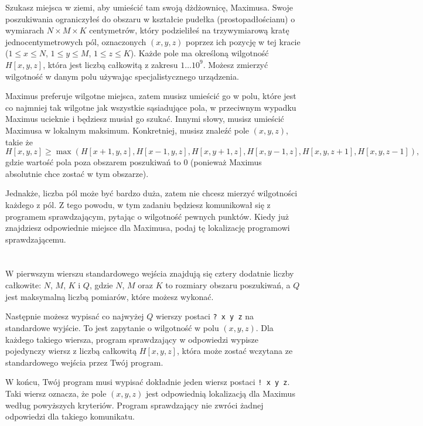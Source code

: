 \ifx\boi\undefined\fi
\def\version{jury-1}

Szukasz miejsca w ziemi, aby umieścić tam swoją dżdżownicę, Maximusa. Swoje poszukiwania ograniczyłeś do obszaru w kształcie pudełka (prostopadłościanu)
o wymiarach $N \times M \times K$ centymetrów, który podzieliłeś na trzywymiarową kratę jednocentymetrowych pól, oznaczonych $(x,y,z)$ poprzez ich pozycję w tej kracie ($1 \le x \le N$, $1 \le y \le M$, $1 \le z \le K$). Każde pole ma określoną wilgotność $H[x,y,z]$, która jest liczbą całkowitą
z zakresu $1 \dots 10^9$. Możesz zmierzyć wilgotność w danym polu używając specjalistycznego urządzenia.

Maximus preferuje wilgotne miejsca, zatem musisz umieścić go w polu, które jest co najmniej tak wilgotne jak wszystkie sąsiadujące pola, w przeciwnym wypadku Maximus ucieknie i będziesz musiał go szukać.
Innymi słowy, musisz umieścić Maximusa w lokalnym maksimum.
Konkretniej, musisz znaleźć pole $(x,y,z)$, takie że
$$
H[x,y,z] \ge \max(H[x+1,y,z], H[x-1,y,z], H[x,y+1,z], H[x,y-1,z], H[x,y,z+1], H[x,y,z-1]),
$$
gdzie wartość pola poza obszarem poszukiwań to $0$ (ponieważ Maximus absolutnie chce zostać w tym obszarze).

Jednakże, liczba pól może być bardzo duża, zatem nie chcesz mierzyć wilgotności każdego z pól. Z tego powodu, w tym zadaniu będziesz komunikował
się z programem sprawdzającym, pytając o wilgotność pewnych punktów. Kiedy już znajdziesz odpowiednie miejsce dla Maximusa, podaj tę lokalizację
programowi sprawdzającemu.

\section*{\interactivity}
W pierwszym wierszu standardowego wejścia znajdują się cztery dodatnie liczby całkowite: $N$, $M$, $K$ i $Q$, gdzie $N$, $M$ oraz $K$ to rozmiary obszaru poszukiwań, a $Q$ jest maksymalną liczbą pomiarów, które możesz wykonać.

Następnie możesz wypisać co najwyżej $Q$ wierszy postaci \texttt{?\ x y z} na standardowe wyjście.
To jest zapytanie o wilgotność w polu $(x, y, z)$.
Dla każdego takiego wiersza, program sprawdzający w odpowiedzi wypisze pojedynczy wiersz z liczbą całkowitą $H[x,y,z]$, która może zostać
wczytana ze standardowego wejścia przez Twój program.

W końcu, Twój program musi wypisać dokładnie jeden wiersz postaci \texttt{!\ x y z}.
Taki wiersz oznacza, że pole $(x, y, z)$ jest odpowiednią lokalizacją dla Maximus według powyższych kryteriów.
Program sprawdzający nie zwróci żadnej odpowiedzi dla takiego komunikatu.

